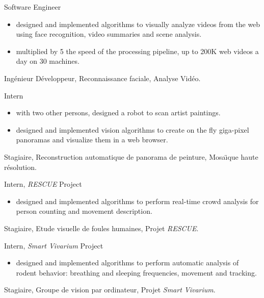 \documentclass{article}
\begin{document}
\begin{llist}
{
Software Engineer
\vspace{-0.33cm}
\begin{itemize}
 \item designed and implemented algorithms to visually analyze videos from the web using face recognition, video 
summaries and scene analysis.
 \item multiplied by 5 the speed of the processing pipeline, up to 200K web videos a day on 30 machines.
\end{itemize}
}
{
Ing\'{e}nieur D\'{e}veloppeur, Reconnaissance faciale, Analyse
Vid\'{e}o.
}


{
Intern
\vspace{-0.33cm}
\begin{itemize}
 \item with two other persons, designed a robot to scan artist paintings.
 \item designed and implemented vision algorithms to create on the fly giga-pixel panoramas and visualize them in a web 
browser.
\end{itemize}
}
{
Stagiaire, Reconstruction automatique de panorama de peinture, Mosa\"{\i}que haute r\'{e}solution.
}

{
Intern, {\em RESCUE} Project
\vspace{-0.33cm}
\begin{itemize}
 \item designed and implemented algorithms to perform real-time crowd analysis for person counting and movement 
description.
\end{itemize}
}
{
Stagiaire, Etude visuelle de foules humaines, Projet {\em RESCUE}.
}

{
Intern, {\em Smart Vivarium} Project
\vspace{-0.33cm}
\begin{itemize}
 \item designed and implemented algorithms to perform automatic analysis of rodent behavior: breathing and sleeping 
frequencies, movement and tracking.
\end{itemize}
}
{
Stagiaire, Groupe de vision par ordinateur, Projet {\em Smart Vivarium}.
}


\end{llist}
\end{document}
